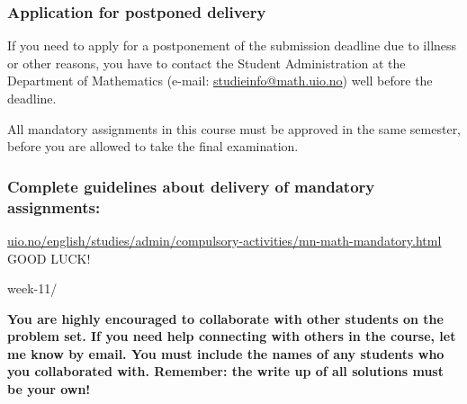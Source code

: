 \documentclass[12pt,
               a4paper,
               article,
               oneside,
               oldfontcommands,
               UKenglish]{memoir}
\begin{document}
\begin{titlingpage}
    \subsubsection*{Application for postponed delivery}
    If you need to apply for a postponement of the submission deadline due to illness or other reasons, you have to contact the Student Administration at the Department of Mathematics (e-mail: \href{mailto:studieinfo@math.uio.no}{studieinfo@math.uio.no}) well before the deadline.

    All mandatory assignments in this course must be approved in the same semester, before you are allowed to take the final examination.

    \subsubsection*{Complete guidelines about delivery of mandatory assignments:}
    \unskip
    \begin{center}
        \unskip
        \href{http://www.uio.no/english/studies/admin/compulsory-activities/mn-math-mandatory.html}
        {
            \resizebox{\textwidth}{!}
            {\underline{uio.no/english/studies/admin/compulsory-activities/mn-math-mandatory.html}}
        }
        \vspace{1ex}
        \vfill
        GOOD LUCK!
    \end{center}
\end{titlingpage}
week-11/

\noindent
{\bf
You are highly encouraged to collaborate with other students on the problem set.  If you need help connecting with others in the course, let me know by email.
You must include the names of any students who you collaborated with. Remember: the write up of all solutions must be your own! }


\noindent
\end{document}
